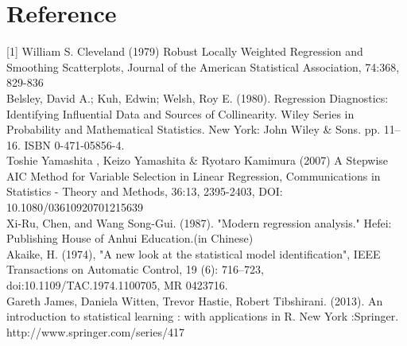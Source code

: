 \documentclass[a4paper]{article}
\begin{document}




\section{Reference}
[1] William S. Cleveland (1979) Robust Locally Weighted Regression and
Smoothing Scatterplots, Journal of the American Statistical Association, 74:368, 829-836\\

\noindent
[2] Belsley, David A.; Kuh, Edwin; Welsh, Roy E. (1980). Regression Diagnostics: Identifying Influential Data and Sources of Collinearity. Wiley Series in Probability and Mathematical Statistics. New York: John Wiley \& Sons. pp. 11–16. ISBN 0-471-05856-4.\\

\noindent
[3] Toshie Yamashita , Keizo Yamashita \& Ryotaro Kamimura (2007) A Stepwise AIC Method for Variable Selection in Linear Regression, Communications in Statistics - Theory and Methods, 36:13, 2395-2403, DOI: 10.1080/03610920701215639\\

\noindent
[4] Xi-Ru, Chen, and Wang Song-Gui. (1987). "Modern regression analysis." Hefei: Publishing House of Anhui Education.(in Chinese)\\

\noindent
[5] Akaike, H. (1974), "A new look at the statistical model identification", IEEE Transactions on Automatic Control, 19 (6): 716–723, doi:10.1109/TAC.1974.1100705, MR 0423716.\\

\noindent
[6] Gareth James, Daniela Witten, Trevor Hastie, Robert Tibshirani. (2013). An introduction to statistical learning : with applications in R. New York :Springer. http://www.springer.com/series/417\\
\end{document}
